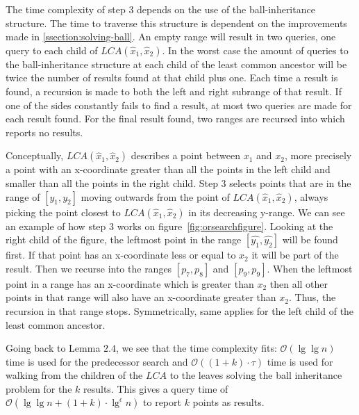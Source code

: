 The time complexity of step $3$ depends on the use of the ball-inheritance structure. The time to traverse this structure is dependent on the improvements made in \ref{ssection:solving-ball}. An empty range will result in two queries, one query to each child of $LCA(\hat{x}_1, \hat{x}_2)$. In the worst case the amount of queries to the ball-inheritance structure at each child of the least common ancestor will be twice the number of results found at that child plus one. Each time a result is found, a recursion is made to both the left and right subrange of that result. If one of the sides constantly fails to find a result, at most two queries are made for each result found. For the final result found, two ranges are recursed into which reports no results.

Conceptually, $LCA(\hat{x}_1, \hat{x}_2)$ describes a point between $x_1$ and $x_2$, more precisely a point with an x-coordinate greater than all the points in the left child and smaller than all the points in the right child. Step $3$ selects points that are in the range of $[y_1, y_2]$ moving outwards from the point of $LCA(\hat{x}_1, \hat{x}_2)$, always picking the point closest to $LCA(\hat{x}_1, \hat{x}_2)$ in its decreasing y-range. We can see an example of how step $3$ works on figure~\ref{fig:orsearchfigure}. Looking at the right child of the figure, the leftmost point in the range $[\hat{y_1}, \hat{y_2}]$ will be found first. If that point has an x-coordinate less or equal to $x_2$ it will be part of the result. Then we recurse into the ranges $[p_7, p_8]$ and $[p_9, p_9]$. When the leftmost point in a range has an x-coordinate which is greater than $x_2$ then all other points in that range will also have an x-coordinate greater than $x_2$. Thus, the recursion in that range stops. Symmetrically, same applies for the left child of the least common ancestor.

Going back to Lemma $2.4$, we see that the time complexity fits: $\mathcal{O}(\lg \lg n)$ time is used for the predecessor search and $\mathcal{O}((1+k)\cdot\tau)$ time is used for walking from the children of the $LCA$ to the leaves solving the ball inheritance problem for the $k$ results. This gives a query time of $\mathcal{O}(\lg\lg n + (1+k)\cdot\lg^\epsilon n)$ to report $k$ points as results.


